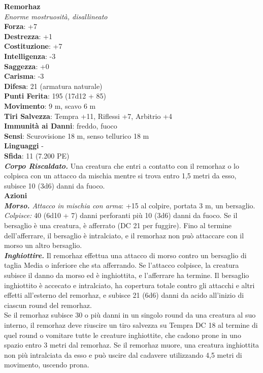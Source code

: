 \begin{multicols}{2}
\medskip\textbf{Remorhaz}\\
\emph{Enorme mostruosità, disallineato}\\
\textbf{Forza}: +7\\
\textbf{Destrezza}: +1\\
\textbf{Costituzione}: +7\\
\textbf{Intelligenza}: -3\\
\textbf{Saggezza}: +0\\
\textbf{Carisma}: -3\\
\textbf{Difesa}: 21 (armatura naturale)\\
\textbf{Punti Ferita}: 195 (17d12 + 85)\\
\textbf{Movimento}: 9 m, scavo 6 m\\
\textbf{Tiri Salvezza}: Tempra +11, Riflessi +7, Arbitrio +4\\
\textbf{Immunità ai Danni}: freddo, fuoco\\
\textbf{Sensi}: Scurovisione 18 m, senso tellurico 18 m\\
\textbf{Linguaggi} -\\
\textbf{Sfida}: 11 (7.200 PE)\smallskip\\
\emph{\textbf{Corpo Riscaldato.}} Una creatura che entri a contatto con il remorhaz o lo colpisca con un attacco da mischia mentre si trova entro 1,5 metri da esso, subisce 10 (3d6) danni da fuoco.\\
\smallskip\textbf{Azioni}\\
\emph{\textbf{Morso.} Attacco in mischia con arma}: +15 al colpire, portata 3 m, un bersaglio.\\
\emph{Colpisce:} 40 (6d10 + 7) danni perforanti più 10 (3d6) danni da fuoco. Se il bersaglio è una creatura, è afferrato (DC  21 per fuggire). Fino al termine dell'afferrare, il bersaglio è intralciato, e il remorhaz non può attaccare con il morso un altro bersaglio.\\
\emph{\textbf{Inghiottire.}} Il remorhaz effettua una attacco di morso contro un bersaglio di taglia Media o inferiore che sta afferrando. Se l'attacco colpisce, la creatura subisce il danno da morso ed è inghiottita, e l'afferrare ha termine. Il bersaglio inghiottito è accecato e intralciato, ha copertura totale contro gli attacchi e altri effetti all'esterno del remorhaz, e subisce 21 (6d6) danni da acido all'inizio di ciascun round del remorhaz.\\
Se il remorhaz subisce 30 o più danni in un singolo round da una creatura al suo interno, il remorhaz deve riuscire un tiro salvezza su Tempra DC  18 al termine di quel round o vomitare tutte le creature inghiottite, che cadono prone in uno spazio entro 3 metri dal remorhaz. Se il remorhaz muore, una creatura inghiottita non più intralciata da esso e può uscire dal cadavere utilizzando 4,5 metri di movimento, uscendo prona.\\

\end{multicols}
